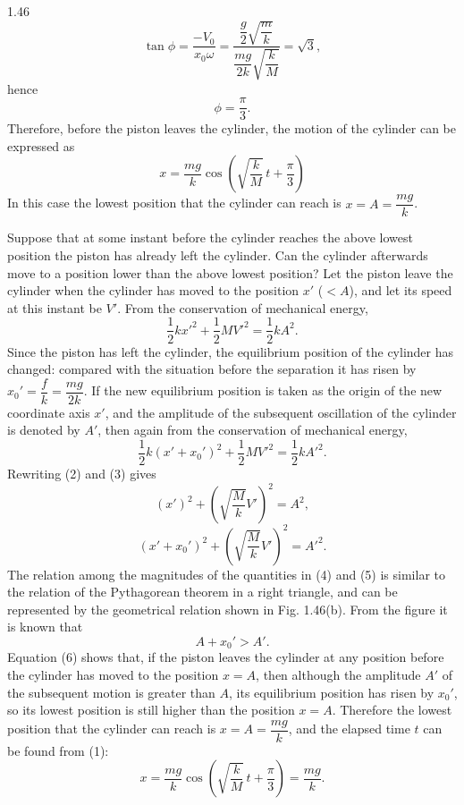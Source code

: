 \begin{solution}{1.46}
\[
\tan\phi=\frac{-V_0}{x_0\omega}
=\frac{\dfrac{g}{2}\sqrt{\dfrac{m}{k}}}{\dfrac{mg}{2k}\sqrt{\dfrac{k}{M}}}
=\sqrt{3},
\]
hence
\[
\phi=\frac{\pi}{3}.
\]
Therefore, before the piston leaves the cylinder, the motion of the cylinder can be expressed as
\begin{equation}
x=\frac{mg}{k}\cos\left(\sqrt{\frac{k}{M}}\,t+\frac{\pi}{3}\right) \tag{1}
\end{equation}
In this case the lowest position that the cylinder can reach is $x=A=\dfrac{mg}{k}$.

Suppose that at some instant before the cylinder reaches the above lowest position the piston has already left the cylinder. Can the cylinder afterwards move to a position lower than the above lowest position? Let the piston leave the cylinder when the cylinder has moved to the position $x'$ ($<A$), and let its speed at this instant be $V'$. From the conservation of mechanical energy,
\begin{equation}
\frac{1}{2}kx'^2+\frac{1}{2}MV'^2=\frac{1}{2}kA^2. \tag{2}
\end{equation}
Since the piston has left the cylinder, the equilibrium position of the cylinder has changed: compared with the situation before the separation it has risen by $x_0'=\dfrac{f}{k}=\dfrac{mg}{2k}$. If the new equilibrium position is taken as the origin of the new coordinate axis $x'$, and the amplitude of the subsequent oscillation of the cylinder is denoted by $A'$, then again from the conservation of mechanical energy,
\begin{equation}
\frac{1}{2}k\left(x'+x_0'\right)^2+\frac{1}{2}MV'^2=\frac{1}{2}kA'^2. \tag{3}
\end{equation}
Rewriting (2) and (3) gives
\begin{equation}
\left(x'\right)^2+\left(\sqrt{\frac{M}{k}}V'\right)^2=A^2, \tag{4}
\end{equation}
\begin{equation}
\left(x'+x_0'\right)^2+\left(\sqrt{\frac{M}{k}}V'\right)^2=A'^2. \tag{5}
\end{equation}
The relation among the magnitudes of the quantities in (4) and (5) is similar to the relation of the Pythagorean theorem in a right triangle, and can be represented by the geometrical relation shown in Fig. 1.46(b). From the figure it is known that
\begin{equation}
A+x_0'>A'. \tag{6}
\end{equation}
Equation (6) shows that, if the piston leaves the cylinder at any position before the cylinder has moved to the position $x=A$, then although the amplitude $A'$ of the subsequent motion is greater than $A$, its equilibrium position has risen by $x_0'$, so its lowest position is still higher than the position $x=A$. Therefore the lowest position that the cylinder can reach is $x=A=\dfrac{mg}{k}$, and the elapsed time $t$ can be found from (1):
\[
x=\frac{mg}{k}\cos\left(\sqrt{\frac{k}{M}}\,t+\frac{\pi}{3}\right)=\frac{mg}{k}.
\]


\end{solution}
